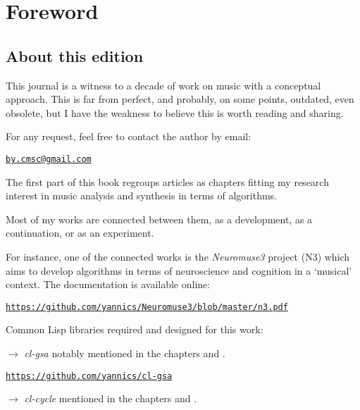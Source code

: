 \frontmatter
\def\thepage{\arabic{page}}
\setcounter{page}{3}

\chapter*{Foreword}
\thispagestyle{empty}

\section*{About this edition}
\label{ate}

This journal is a witness to a decade of work on music with a conceptual approach.
This is far from perfect, and probably, on some points, outdated, even obsolete, but I have the weakness to believe this is worth reading and sharing.

\bigskip
\bigskip

For any request, feel free to contact the author by email: 

\smallskip

\quad \quad \href{mailto:jby.cmsc@gmail.com}{\texttt{by.cmsc@gmail.com}}

\bigskip
\bigskip

The first part of this book regroups articles as chapters fitting my research interest in music analysis and synthesis in terms of algorithms. 
\smallskip

Most of my works are connected between them, as a development, as a continuation, or as an experiment.

\smallskip
For instance, one of the connected works is the \textsl{Neuromuse3} project (N3) which aims to develop algorithms in terms of neuroscience and cognition in a `musical' context. The documentation is available online:

\href{https://github.com/yannics/Neuromuse3/blob/master/n3.pdf}{\texttt{\small https://github.com/yannics/Neuromuse3/blob/master/n3.pdf}}

\bigskip
\bigskip
Common Lisp libraries required and designed for this work:

\smallskip

\noindent $\rightarrow$ \textsl{cl-gsa} notably mentioned in the chapters \textsl{} and \textsl{}.

\href{https://github.com/yannics/cl-gsa}{\texttt{\small https://github.com/yannics/cl-gsa}}

\smallskip

\noindent $\rightarrow$ \textsl{cl-cycle} mentioned in the chapters \textsl{} and  \textsl{}. 

